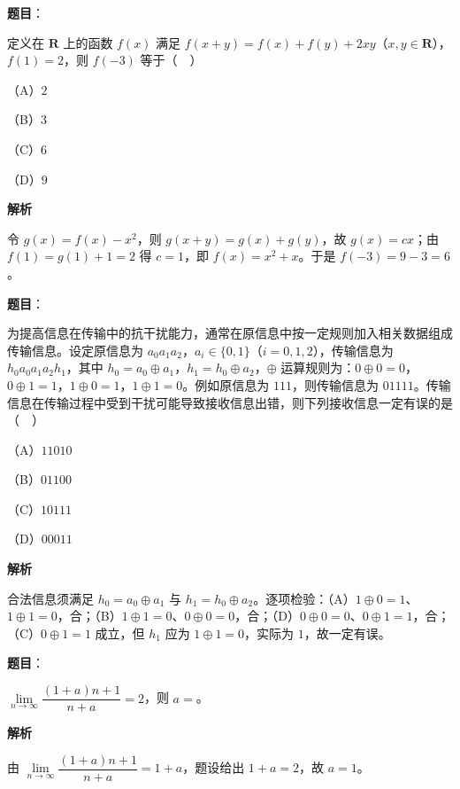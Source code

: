 \begin{answer}

\textbf{题目}：

定义在 $\mathbf R$ 上的函数 $f(x)$ 满足 $f(x+y)=f(x)+f(y)+2xy$（$x,y\in\mathbf R$），$f(1)=2$，则 $f(-3)$ 等于（　）

（A）$2$

（B）$3$

（C）$6$

（D）$9$

\textbf{解析}

令 $g(x)=f(x)-x^2$，则 $g(x+y)=g(x)+g(y)$，故 $g(x)=cx$；由 $f(1)=g(1)+1=2$ 得 $c=1$，即 $f(x)=x^2+x$。于是 $f(-3)=9-3=6$。


\end{answer}
\begin{answer}

\textbf{题目}：

为提高信息在传输中的抗干扰能力，通常在原信息中按一定规则加入相关数据组成传输信息。设定原信息为 $a_0a_1a_2$，$a_i\in\{0,1\}$（$i=0,1,2$），传输信息为 $h_0a_0a_1a_2h_1$，其中 $h_0=a_0\oplus a_1$，$h_1=h_0\oplus a_2$，$\oplus$ 运算规则为：$0\oplus0=0$，$0\oplus1=1$，$1\oplus0=1$，$1\oplus1=0$。例如原信息为 $111$，则传输信息为 $01111$。传输信息在传输过程中受到干扰可能导致接收信息出错，则下列接收信息一定有误的是（　）

（A）$11010$

（B）$01100$

（C）$10111$

（D）$00011$

\textbf{解析}

合法信息须满足 $h_0=a_0\oplus a_1$ 与 $h_1=h_0\oplus a_2$。逐项检验：（A）$1\oplus0=1$、$1\oplus1=0$，合；（B）$1\oplus1=0$、$0\oplus0=0$，合；（D）$0\oplus0=0$、$0\oplus1=1$，合；（C）$0\oplus1=1$ 成立，但 $h_1$ 应为 $1\oplus1=0$，实际为 $1$，故一定有误。


\end{answer}
\begin{answer}

\textbf{题目}：

$\lim\limits_{n\to\infty}\dfrac{(1+a)n+1}{n+a}=2$，则 $a=$\gkblank{}。

\textbf{解析}

由 $\lim\limits_{n\to\infty}\dfrac{(1+a)n+1}{n+a}=1+a$，题设给出 $1+a=2$，故 $a=1$。


\end{answer}

